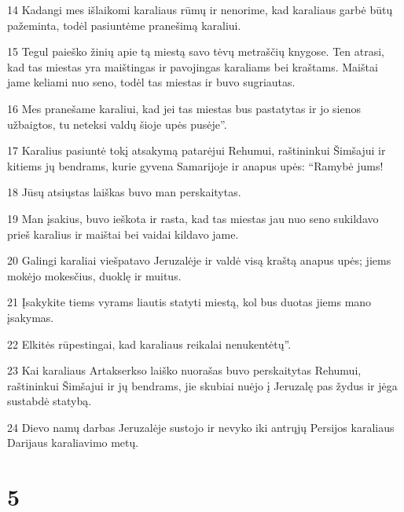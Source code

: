 \par 14 Kadangi mes išlaikomi karaliaus rūmų ir nenorime, kad karaliaus garbė būtų pažeminta, todėl pasiuntėme pranešimą karaliui. 
\par 15 Tegul paieško žinių apie tą miestą savo tėvų metraščių knygose. Ten atrasi, kad tas miestas yra maištingas ir pavojingas karaliams bei kraštams. Maištai jame keliami nuo seno, todėl tas miestas ir buvo sugriautas. 
\par 16 Mes pranešame karaliui, kad jei tas miestas bus pastatytas ir jo sienos užbaigtos, tu neteksi valdų šioje upės pusėje”. 
\par 17 Karalius pasiuntė tokį atsakymą patarėjui Rehumui, raštininkui Šimšajui ir kitiems jų bendrams, kurie gyvena Samarijoje ir anapus upės: “Ramybė jums! 
\par 18 Jūsų atsiųstas laiškas buvo man perskaitytas. 
\par 19 Man įsakius, buvo ieškota ir rasta, kad tas miestas jau nuo seno sukildavo prieš karalius ir maištai bei vaidai kildavo jame. 
\par 20 Galingi karaliai viešpatavo Jeruzalėje ir valdė visą kraštą anapus upės; jiems mokėjo mokesčius, duoklę ir muitus. 
\par 21 Įsakykite tiems vyrams liautis statyti miestą, kol bus duotas jiems mano įsakymas. 
\par 22 Elkitės rūpestingai, kad karaliaus reikalai nenukentėtų”. 
\par 23 Kai karaliaus Artakserkso laiško nuorašas buvo perskaitytas Rehumui, raštininkui Šimšajui ir jų bendrams, jie skubiai nuėjo į Jeruzalę pas žydus ir jėga sustabdė statybą. 
\par 24 Dievo namų darbas Jeruzalėje sustojo ir nevyko iki antrųjų Persijos karaliaus Darijaus karaliavimo metų.



\chapter{5}

